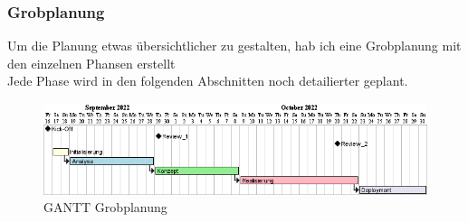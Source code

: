 \subsubsection{Grobplanung}
Um die Planung etwas übersichtlicher zu gestalten, hab ich eine Grobplanung mit den einzelnen Phansen erstellt\\
Jede Phase wird in den folgenden Abschnitten noch detailierter geplant.
\begin{figure}[H]
    \begin{center}
      \includegraphics[width=1\linewidth]{../content/diagrams/gantt/roughtPlanning/roughtPlanning.png}
      \caption{GANTT Grobplanung}
    \end{center}
  \end{figure}
